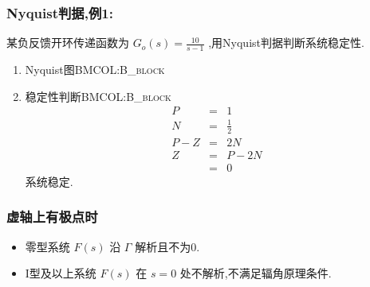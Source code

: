 \documentclass[table]{beamer}
\begin{document}
\subsubsection{Nyquist判据,例1:}
\label{sec:orge444cab}
某负反馈开环传递函数为 \(G_o(s)=\frac{10}{s-1}\) ,用Nyquist判据判断系统稳定性.

\begin{enumerate}
\item Nyquist图\hfill{}\textsc{BMCOL:B\_block}
\label{sec:org0eab839}

\item 稳定性判断\hfill{}\textsc{BMCOL:B\_block}
\label{sec:org4f01930}
\begin{eqnarray*}
P & = & 1\\
N &=& \frac{1}{2} \\
P-Z &=& 2N \\
Z &=& P-2N \\
  &=&0 
\end{eqnarray*}
系统稳定.
\end{enumerate}

\subsubsection{虚轴上有极点时}
\label{sec:orgb51dbcc}
\begin{itemize}
\item 零型系统 \(F(s)\) 沿 \(\Gamma\) 解析且不为0.
\item I型及以上系统 \(F(s)\) 在 \(s=0\) 处不解析,不满足辐角原理条件.
\end{itemize}
\end{document}
